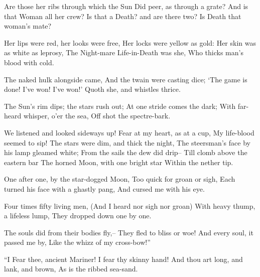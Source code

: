 \documentclass{book}
\newcommand{\strophaV}{%
  \Forma \strophae {0{\penalty 10000}000{\penalty 10000}0}}
\newcommand{\strophaIX}{%
  \Forma \strophae {0{\penalty 10000}0000000{\penalty 10000}0}}
\begin{document}
{\strophaV
{}
  Are those her ribs through which the Sun                           
  Did peer, as through a grate?
  And is that Woman all her crew?
  Is that a Death? and are there two?
  Is Death that woman's mate?

%
  Her lips were red, her looks were free,                            
  Her locks were yellow as gold:
%
  Her skin was as white as leprosy,
  The Night-mare Life-in-Death was she,
  Who thicks man's blood with cold.
}
  The naked hulk alongside came,                                     
  And the twain were casting dice;
  `The game is done! I've won! I've won!'
  Quoth she, and whistles thrice.

%
  The Sun's rim dips; the stars rush out;
  At one stride comes the dark;                                      
  With far-heard whisper, o'er the sea,
  Off shot the spectre-bark.

{\strophaIX
{}%
  We listened and looked sideways up!
  Fear at my heart, as at a cup,
  My life-blood seemed to sip!                                       
  The stars were dim, and thick the night,
  The steersman's face by his lamp gleamed white;
  From the sails the dew did drip--
  Till clomb above the eastern bar
  The horned Moon, with one bright star                              
  Within the nether tip.
}

%
  One after one, by the star-dogged Moon,
  Too quick for groan or sigh,
  Each turned his face with a ghastly pang,
  And cursed me with his eye.                                        

%
  Four times fifty living men,
  (And I heard nor sigh nor groan)
  With heavy thump, a lifeless lump,
  They dropped down one by one.

%
  The souls did from their bodies fly,--                             
  They fled to bliss or woe!
  And every soul, it passed me by,
  Like the whizz of my cross-bow!''



\Part

%
  ``I Fear thee, ancient Mariner!
  I fear thy skinny hand!                                            
  And thou art long, and lank, and brown,
  As is the ribbed sea-sand.
\end{document}
